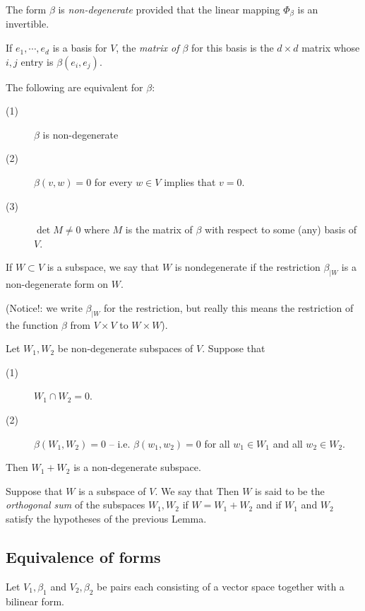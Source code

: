 \documentclass[11pt]{article}
\numberwithin{equation}{section}
\begin{document}
The form \(\beta\) is \emph{non-degenerate} provided that the linear mapping
\(\Phi_\beta\) is an invertible.

If \(e_1,\cdots,e_d\) is a basis for \(V\), the \emph{matrix of \(\beta\)}
for this basis is the \(d \times d\) matrix whose \(i,j\) entry is
\(\beta(e_i,e_j)\).

\begin{lemma}
The following are equivalent for \(\beta\):
\begin{description}
\item[{(1)}] \(\beta\) is non-degenerate
\item[{(2)}] \(\beta(v,w) = 0\) for every \(w \in V\) implies that \(v = 0\).
\item[{(3)}] \(\det M\ne 0\) where \(M\) is the matrix of \(\beta\) with
respect to some (any) basis of \(V\).
\end{description}
\label{lemma:non-deg-condition}
\end{lemma}

If \(W \subset V\) is a subspace, we say that \(W\) is nondegenerate
if the restriction \(\beta_{\mid W}\) is a non-degenerate form on
\(W\).

(Notice!: we write \(\beta_{\mid W}\) for the restriction, but really
this means the restriction of the function \(\beta\) from \(V\times V\)
to \(W \times W\)).

\begin{lemma}
Let \(W_1,W_2\) be non-degenerate subspaces of \(V\).
Suppose that
\begin{description}
\item[{(1)}] \(W_1 \cap W_2 = 0\).
\item[{(2)}] \(\beta(W_1,W_2) = 0\) -- i.e. \(\beta(w_1,w_2) = 0\) for all
\(w_1 \in W_1\) and all \(w_2 \in W_2\).
\end{description}
Then \(W_1 + W_2\) is a non-degenerate subspace.
\label{lemma:orthog-sum}
\end{lemma}

Suppose that \(W\) is a subspace of \(V\). We say that Then \(W\) is
said to be the \emph{orthogonal sum} of the subspaces \(W_1, W_2\)
if \(W= W_1 + W_2\) and if \(W_1\) and \(W_2\) satisfy the hypotheses
of the previous Lemma.
\subsection{Equivalence of forms}
\label{sec:equivalence-of-forms}
Let \(V_1,\beta_1\) and \(V_2,\beta_2\) be pairs each consisting of a
vector space together with a bilinear form.
\end{document}
